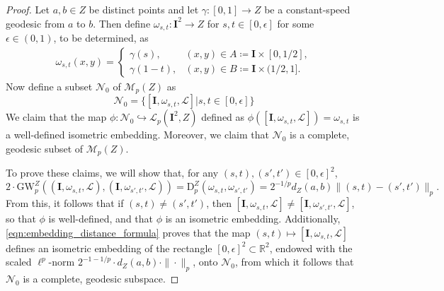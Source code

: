 \documentclass{article}
\theoremstyle{definition}
\newcommand{\R}{\mathbb{R}}
\newcommand{\M}{\mathcal{M}}
\newcommand{\MZp}{\M_p(Z)}
\newcommand{\dgwz}{\mathrm{GW}_p^Z}
\newcommand{\Lp}{\mathcal{L}_p}
\newcommand{\dpz}{\mathrm{D}^Z_p}
\begin{document}
\begin{proof}
    Let $a,b \in Z$ be distinct points and let $\gamma:[0,1]\to Z$ be a constant-speed geodesic from $a$ to $b$. Then define $\omega_{s, t}: \mathbf{I}^2\to Z$ for $s, t \in [0,\epsilon]$ for some $\epsilon \in (0,1)$, to be determined, as
    \begin{align}
        \omega_{s,t}(x, y) = \begin{cases}
            \gamma(s), & (x, y) \in A \coloneqq \mathbf{I}\times[0, 1/2],\\
            \gamma(1-t), & (x, y) \in B \coloneqq \mathbf{I}\times(1/2, 1].
        \end{cases}
    \end{align}
    Now define a subset $\mathcal{N}_0$ of $\MZp$ as
    \begin{equation}
        \mathcal{N}_0 = \{[\mathbf{I}, \omega_{s,t}, \mathscr{L}]|s, t \in [0, \epsilon]\}
    \end{equation}
    We claim that the map $\phi: \mathcal{N}_0 \hookrightarrow \Lp(\mathbf{I}^2, Z)$ defined as $\phi([\mathbf{I}, \omega_{s,t}, \mathscr{L}]) = \omega_{s,t}$ is a well-defined isometric embedding. Moreover, we claim that $\mathcal{N}_0$ is a complete, geodesic subset of $\MZp$.

    To prove these claims, we will show that, for any $(s,t),(s',t') \in [0,\epsilon]^2$, 
    \begin{equation}\label{eqn:embedding_distance_formula}
        2 \cdot \dgwz((\mathbf{I}, \omega_{s,t}, \mathscr{L}), (\mathbf{I}, \omega_{s', t'}, \mathscr{L})) = \dpz(\omega_{s,t}, \omega_{s', t'}) = 2^{-1/p} d_Z(a,b) \|(s,t) - (s', t')\|_p.
    \end{equation}
    From this, it follows that if $(s,t) \neq (s',t')$, then $[\mathbf{I},\omega_{s,t},\mathscr{L}] \neq [\mathbf{I}, \omega_{s',t'},\mathscr{L}]$, so that $\phi$ is well-defined, and that $\phi$ is an isometric embedding. Additionally, \eqref{eqn:embedding_distance_formula} proves that the map $(s,t) \mapsto [\mathbf{I},\omega_{s,t},\mathscr{L}]$ defines an isometric embedding of the rectangle $[0,\epsilon]^2 \subset \R^2$, endowed with the scaled $\ell^p$-norm $2^{-1-1/p} \cdot d_Z(a,b) \cdot \|\cdot \|_p$, onto $\mathcal{N}_0$, from which it follows that $\mathcal{N}_0$ is a complete, geodesic subspace.


\end{proof}
\end{document}
